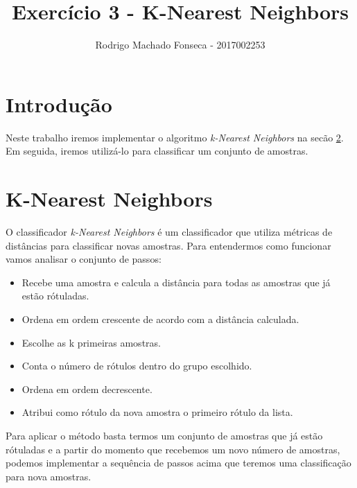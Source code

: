 \documentclass[12pt]{article}
\begin{document}

\pagestyle{fancy}
\fancyhf{}
\renewcommand{\headrulewidth}{0.4pt}
\fancyfoot[C]{\thepage}
\renewcommand{\footrulewidth}{0.4pt}
\fancyfoot[C]{\thepage}
\title{\LARGE \bf
 Exercício 3 -  K-Nearest Neighbors}
\author{ Rodrigo Machado Fonseca - 2017002253}
\thispagestyle{fancy}
\maketitle
\thispagestyle{fancy}

\section{Introdução}

  \par Neste trabalho iremos implementar o algoritmo \textit{k-Nearest Neighbors} na secão \ref{knn}. Em seguida, iremos utilizá-lo para classificar um conjunto de amostras. 
  
\section{K-Nearest Neighbors}
  \label{knn}
  \par O classificador \textit{k-Nearest Neighbors} é um classificador que utiliza métricas de distâncias para classificar novas amostras. Para entendermos como funcionar vamos analisar o conjunto de passos:

  \begin{itemize}
    \item Recebe uma amostra e calcula a distância para todas as amostras que já estão rótuladas. 
    \item Ordena em ordem crescente de acordo com a distância calculada.
    \item Escolhe as k primeiras amostras.
    \item Conta o número de rótulos dentro do grupo escolhido.
    \item Ordena em ordem decrescente. 
    \item Atribui como rótulo da nova amostra o primeiro rótulo da lista. 
  \end{itemize}

  \par Para aplicar o método basta termos um conjunto de amostras que já estão rótuladas e a partir do momento que recebemos um novo número de amostras, podemos implementar a sequência de passos acima que teremos uma classificação para nova amostras. 




\begin{thebibliography}{99}
		\label{BreastCancer}
\end{thebibliography}	
\end{document}
